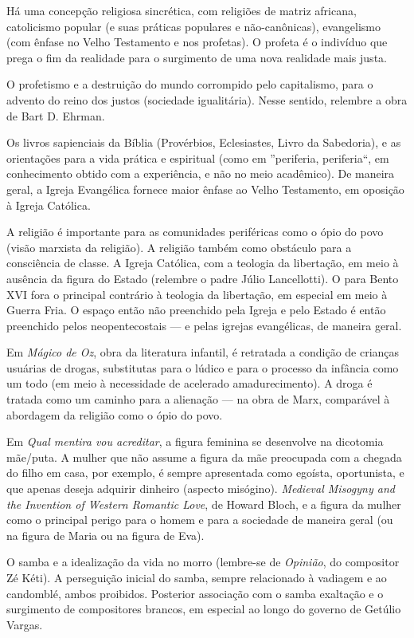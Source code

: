 Há uma concepção religiosa sincrética, com religiões de matriz africana, catolicismo popular (e suas práticas populares e não-canônicas), evangelismo (com ênfase no Velho Testamento e nos profetas). O profeta é o indivíduo que prega o fim da realidade para o surgimento de uma nova realidade mais justa.

O profetismo e a destruição do mundo corrompido pelo capitalismo, para o advento do reino dos justos (sociedade igualitária). Nesse sentido, relembre a obra de Bart D. Ehrman.

Os livros sapienciais da Bíblia (Provérbios, Eclesiastes, Livro da Sabedoria), e as orientações para a vida prática e espiritual (como em ''periferia, periferia``, em conhecimento obtido com a experiência, e não no meio acadêmico). De maneira geral, a Igreja Evangélica fornece maior ênfase ao Velho Testamento, em oposição à Igreja Católica.

A religião é importante para as comunidades periféricas como o ópio do povo (visão marxista da religião). A religião também como obstáculo para a consciência de classe. A Igreja Católica, com a teologia da libertação, em meio à ausência da figura do Estado (relembre o padre Júlio Lancellotti). O para Bento XVI fora o principal contrário à teologia da libertação, em especial em meio à Guerra Fria. O espaço então não preenchido pela Igreja e pelo Estado é então preenchido pelos neopentecostais — e pelas igrejas evangélicas, de maneira geral.

Em \textit{Mágico de Oz}, obra da literatura infantil, é retratada a condição de crianças usuárias de drogas, substitutas para o lúdico e para o processo da infância como um todo (em meio à necessidade de acelerado amadurecimento). A droga é tratada como um caminho para a alienação — na obra de Marx, comparável à abordagem da religião como o ópio do povo.

Em \textit{Qual mentira vou acreditar}, a figura feminina se desenvolve na dicotomia mãe/puta. A mulher que não assume a figura da mãe preocupada com a chegada do filho em casa, por exemplo, é sempre apresentada como egoísta, oportunista, e que apenas deseja adquirir dinheiro (aspecto misógino). \textit{Medieval Misogyny and the Invention of Western Romantic Love}, de Howard Bloch, e a figura da mulher como o principal perigo para o homem e para a sociedade de maneira geral (ou na figura de Maria ou na figura de Eva).

O samba e a idealização da vida no morro (lembre-se de \textit{Opinião}, do compositor Zé Kéti). A perseguição inicial do samba, sempre relacionado à vadiagem e ao candomblé, ambos proibidos. Posterior associação com o samba exaltação e o surgimento de compositores brancos, em especial ao longo do governo de Getúlio Vargas.

